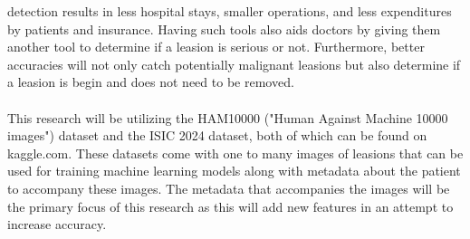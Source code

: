\documentclass[10pt,twocolumn,letterpaper]{article}
\begin{document}
    detection results in less hospital stays, smaller operations, and less
    expenditures by patients and insurance.  Having such tools also aids
    doctors by giving them another tool to determine if a leasion is serious
    or not.  Furthermore, better accuracies will not only catch potentially malignant
    leasions but also determine if a leasion is begin and does not need to
    be removed. \\
    \\
    This research will be utilizing the HAM10000 ("Human Against Machine 10000 images")
    dataset and the ISIC 2024 dataset, both of which can be found on kaggle.com.  These datasets come with one to many images
    of leasions that can be used for training machine learning models along with
    metadata about the patient to accompany these images.  The metadata that accompanies
    the images will be the primary focus of this research as this will add new features
    in an attempt to increase accuracy. \\
    
\end{document}
